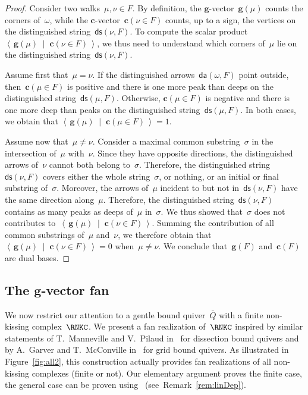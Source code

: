 \documentclass{memo-l}
\theoremstyle{definition}
\renewcommand{\b}[1]{\mathbf{#1}} %
\newcommand{\dotprod}[2]{\left\langle \, #1 \; \middle| \; #2 \, \right\rangle} %
\newcommand{\fref}[1]{Figure~\ref{#1}} %
\newcommand{\distinguishedArrows}[2]{\mathsf{da}(#1,#2)} %
\newcommand{\distinguishedString}[2]{\mathsf{ds}(#1,#2)} %
\newcommand{\gvector}[1]{\mathbf{g}(#1)} %
\newcommand{\gvectors}[1]{\mathbf{g}(#1)} %
\newcommand{\cvector}[2]{\mathbf{c}(#1 \in #2)} %
\newcommand{\cvectors}[1]{\mathbf{c}(#1)} %
\begin{document}
\begin{proof}
Consider two walks~$\mu, \nu \in F$.
By definition, the $\b{g}$-vector~$\gvector{\mu}$ counts the corners of~$\omega$, while the $\b{c}$-vector~$\cvector{\nu}{F}$ counts, up to a sign, the vertices on the distinguished string~$\distinguishedString{\nu}{F}$. 
To compute the scalar product~$\dotprod{\gvector{\mu}}{\cvector{\nu}{F}}$, we thus need to understand which corners of~$\mu$ lie on the distinguished string~$\distinguishedString{\nu}{F}$.

Assume first that~$\mu = \nu$. If the distinguished arrows~$\distinguishedArrows{\omega}{F}$ point outside, then~$\cvector{\mu}{F}$ is positive and there is one more peak than deeps on the distinguished string~$\distinguishedString{\mu}{F}$.
Otherwise, ${\cvector{\mu}{F}}$ is negative and there is one more deep than peaks on the distinguished string~$\distinguishedString{\mu}{F}$.
In both cases, we obtain that $\dotprod{\gvector{\mu}}{\cvector{\mu}{F}} = 1$.

Assume now that~$\mu \ne \nu$.
Consider a maximal common substring~$\sigma$ in the intersection of~$\mu$ with~$\nu$.
Since they have opposite directions, the distinguished arrows of~$\nu$ cannot both belong to~$\sigma$.
Therefore, the distinguished string~$\distinguishedString{\nu}{F}$ covers either the whole string~$\sigma$, or nothing, or an initial or final substring of~$\sigma$.
Moreover, the arrows of~$\mu$ incident to but not in~$\distinguishedString{\nu}{F}$ have the same direction along~$\mu$.
Therefore, the distinguished string~$\distinguishedString{\nu}{F}$ contains as many peaks as deeps of~$\mu$ in~$\sigma$.
We thus showed that~$\sigma$ does not contributes to~$\dotprod{\gvector{\mu}}{\cvector{\nu}{F}}$.
Summing the contribution of all common substrings of~$\mu$ and~$\nu$, we therefore obtain that~$\dotprod{\gvector{\mu}}{\cvector{\nu}{F}} = 0$ when~$\mu \ne \nu$.
We conclude that~$\gvectors{F}$ and~$\cvectors{F}$ are dual bases.
\end{proof}

\subsection{The $\b{g}$-vector fan}
\label{subsec:gvectorFan}

We now restrict our attention to a gentle bound quiver~$\bar Q$ with a finite non-kissing complex~$\RNKC$.
We present a fan realization of~$\RNKC$ inspired by similar statements of T.~Manneville and V.~Pilaud in~\cite{MannevillePilaud-accordion} for dissection bound quivers and by A.~Garver and T.~McConville in~\cite{GarverMcConville-grid} for grid bound quivers.
As illustrated in \fref{fig:all2}, this construction actually provides fan realizations of all non-kissing complexes (finite or not).
Our elementary argument proves the finite case, the general case can be proven using~\cite{DehyKeller, DemonetIyamaJasso} (see~Remark~\ref{rem:linDep}).
\end{document}
